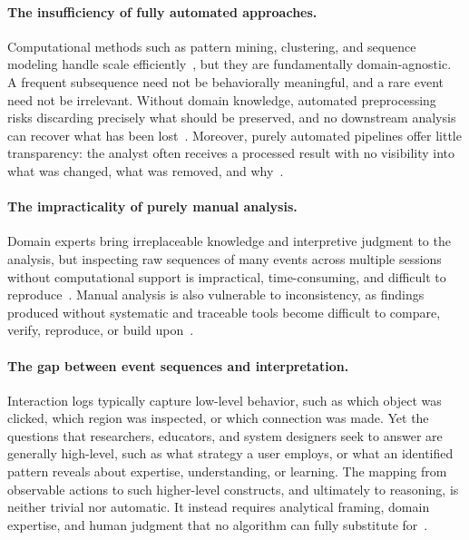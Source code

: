 \paragraph{The insufficiency of fully automated approaches.}
Computational methods such as pattern mining, clustering, and sequence modeling handle scale efficiently~\cite{du2017coping, guo2022survey, yeshchenko2024survey}, but they are fundamentally domain-agnostic.
A frequent subsequence need not be behaviorally meaningful, and a rare event need not be irrelevant.
Without domain knowledge, automated preprocessing risks discarding precisely what should be preserved, and no downstream analysis can recover what has been lost~\cite{kandel2011research}.
Moreover, purely automated pipelines offer little transparency: the analyst often receives a processed result with no visibility into what was changed, what was removed, and why~\cite{shneiderman2019interactive, wu2016survey, guo2022survey}.

\paragraph{The impracticality of purely manual analysis.}
Domain experts bring irreplaceable knowledge and interpretive judgment to the analysis, but inspecting raw sequences of many events across multiple sessions without computational support is impractical, time-consuming, and difficult to reproduce~\cite{kandel2011research}.
Manual analysis is also vulnerable to inconsistency, as findings produced without systematic and traceable tools become difficult to compare, verify, reproduce, or build upon~\cite{silva2007provenance, north2011analytic, xu2020survey}.

\paragraph{The gap between event sequences and interpretation.}
Interaction logs typically capture low-level behavior, such as which object was clicked, which region was inspected, or which connection was made.
Yet the questions that researchers, educators, and system designers seek to answer are generally high-level, such as what strategy a user employs, or what an identified pattern reveals about expertise, understanding, or learning.
The mapping from observable actions to such higher-level constructs, and ultimately to reasoning, is neither trivial nor automatic.
It instead requires analytical framing, domain expertise, and human judgment that no algorithm can fully substitute for~\cite{ceneda2017characterizing, shneiderman2019interactive, miksch2024visual}.





